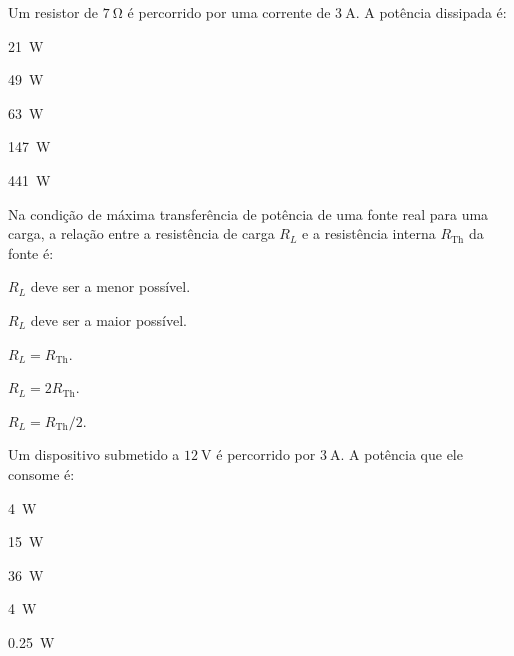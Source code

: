 \blocofixacao
\begin{questao}[1]{}

Um resistor de $\SI{7}{\ohm}$ é percorrido por uma corrente de $\SI{3}{\ampere}$.
A potência dissipada é:
\begin{alternativas}[3]
\item \SI{21}{\watt}
\item \SI{49}{\watt}
\item \SI{63}{\watt}
\item \SI{147}{\watt}
\item \SI{441}{\watt}
\end{alternativas}


\end{questao}
\begin{questao}[1]{}

Na condição de máxima transferência de potência de uma fonte real para uma carga,
a relação entre a resistência de carga $R_L$ e a resistência interna
$R_{\text{Th}}$ da fonte é:
\begin{alternativas}
\item $R_L$ deve ser a menor possível.
\item $R_L$ deve ser a maior possível.
\item $R_L = R_{\text{Th}}$.
\item $R_L = 2R_{\text{Th}}$.
\item $R_L = R_{\text{Th}}/2$.
\end{alternativas}


\end{questao}
\begin{questao}[1]{}

Um dispositivo submetido a $\SI{12}{\volt}$ é percorrido por $\SI{3}{\ampere}$. A
potência que ele consome é:
\begin{alternativas}[3]
\item \SI{4}{\watt}
\item \SI{15}{\watt}
\item \SI{36}{\watt}
\item \SI{4}{\watt}
\item \SI{0.25}{\watt}
\end{alternativas}


\end{questao}

